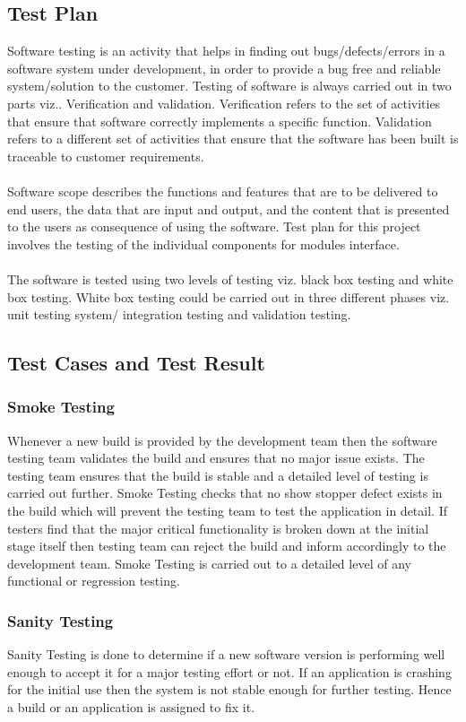 \documentclass[oneside, 12pt]{book}
\begin{document}
		\subsection{Test Plan}
			Software testing is an activity that helps in finding out bugs/defects/errors in a software system under development, in order to provide a bug free and reliable system/solution to the customer. Testing of software is always carried out in two parts viz.. Verification and validation. Verification refers to the set of activities that ensure that software correctly implements a specific function. Validation refers to a different set of activities that ensure that the software has been built is traceable to customer requirements.
			\\\\Software scope describes the functions and features that are to be delivered to end users, the data that are input and output, and the content that is presented to the users as consequence of using the software. Test plan for this project involves the testing of the individual components for modules interface.
			\\\\The software is tested using two levels of testing viz. black box testing and white box testing. White box testing could be carried out in three different phases viz. unit testing system/ integration testing and validation testing.
		\subsection{Test Cases and Test Result}
			\subsubsection{Smoke Testing}
				Whenever a new build is provided by the development team then the software testing team validates the build and ensures that no major issue exists. The testing team ensures that the build is stable and a detailed level of testing is carried out further. Smoke Testing checks that no show stopper defect exists in the build which will prevent the testing team to test the application in detail. If testers find that the major critical functionality is broken down at the initial stage itself then testing team can reject the build and inform accordingly to the development team. Smoke Testing is carried out to a detailed level of any functional or regression testing.
			\subsubsection{Sanity Testing}
				Sanity Testing is done to determine if a new software version is performing well enough to accept it for a major testing effort or not. If an application is crashing for the initial use then the system is not stable enough for further testing. Hence a build or an application is assigned to fix it.
\end{document}

